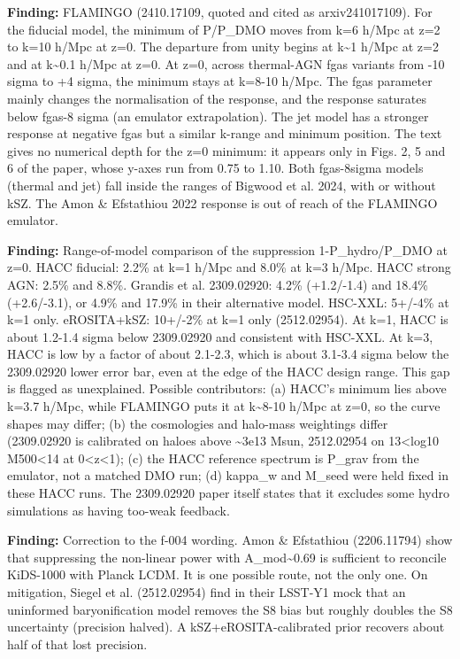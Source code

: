 \documentclass[11pt,a4paper]{article}
\begin{document}
\textbf{Finding:} FLAMINGO (2410.17109, quoted and cited as arxiv241017109). For the fiducial model, the minimum of P/P\_DMO moves from k=6 h/Mpc at z=2 to k=10 h/Mpc at z=0. The departure from unity begins at k\textasciitilde{}1 h/Mpc at z=2 and at k\textasciitilde{}0.1 h/Mpc at z=0. At z=0, across thermal-AGN fgas variants from -10 sigma to +4 sigma, the minimum stays at k=8-10 h/Mpc. The fgas parameter mainly changes the normalisation of the response, and the response saturates below fgas-8 sigma (an emulator extrapolation). The jet model has a stronger response at negative fgas but a similar k-range and minimum position. The text gives no numerical depth for the z=0 minimum: it appears only in Figs. 2, 5 and 6 of the paper, whose y-axes run from 0.75 to 1.10. Both fgas-8sigma models (thermal and jet) fall inside the ranges of Bigwood et al. 2024, with or without kSZ. The Amon \& Efstathiou 2022 response is out of reach of the FLAMINGO emulator.

\textbf{Finding:} Range-of-model comparison of the suppression 1-P\_hydro/P\_DMO at z=0. HACC fiducial: 2.2\% at k=1 h/Mpc and 8.0\% at k=3 h/Mpc. HACC strong AGN: 2.5\% and 8.8\%. Grandis et al. 2309.02920: 4.2\% (+1.2/-1.4) and 18.4\% (+2.6/-3.1), or 4.9\% and 17.9\% in their alternative model. HSC-XXL: 5+/-4\% at k=1 only. eROSITA+kSZ: 10+/-2\% at k=1 only (2512.02954). At k=1, HACC is about 1.2-1.4 sigma below 2309.02920 and consistent with HSC-XXL. At k=3, HACC is low by a factor of about 2.1-2.3, which is about 3.1-3.4 sigma below the 2309.02920 lower error bar, even at the edge of the HACC design range. This gap is flagged as unexplained. Possible contributors: (a) HACC's minimum lies above k=3.7 h/Mpc, while FLAMINGO puts it at k\textasciitilde{}8-10 h/Mpc at z=0, so the curve shapes may differ; (b) the cosmologies and halo-mass weightings differ (2309.02920 is calibrated on haloes above \textasciitilde{}3e13 Msun, 2512.02954 on 13\textless{}log10 M500\textless{}14 at 0\textless{}z\textless{}1); (c) the HACC reference spectrum is P\_grav from the emulator, not a matched DMO run; (d) kappa\_w and M\_seed were held fixed in these HACC runs. The 2309.02920 paper itself states that it excludes some hydro simulations as having too-weak feedback.

\textbf{Finding:} Correction to the f-004 wording. Amon \& Efstathiou (2206.11794) show that suppressing the non-linear power with A\_mod\textasciitilde{}0.69 is sufficient to reconcile KiDS-1000 with Planck LCDM. It is one possible route, not the only one. On mitigation, Siegel et al. (2512.02954) find in their LSST-Y1 mock that an uninformed baryonification model removes the S8 bias but roughly doubles the S8 uncertainty (precision halved). A kSZ+eROSITA-calibrated prior recovers about half of that lost precision.
\end{document}
